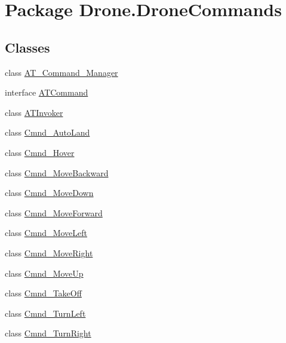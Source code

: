 \hypertarget{namespace_drone_1_1_drone_commands}{}\section{Package Drone.\+Drone\+Commands}
\label{namespace_drone_1_1_drone_commands}
\subsection*{Classes}
\begin{DoxyCompactItemize}
\item 
class \hyperlink{class_drone_1_1_drone_commands_1_1_a_t___command___manager}{A\+T\+\_\+\+Command\+\_\+\+Manager}
\item 
interface \hyperlink{interface_drone_1_1_drone_commands_1_1_a_t_command}{A\+T\+Command}
\item 
class \hyperlink{class_drone_1_1_drone_commands_1_1_a_t_invoker}{A\+T\+Invoker}
\item 
class \hyperlink{class_drone_1_1_drone_commands_1_1_cmnd___auto_land}{Cmnd\+\_\+\+Auto\+Land}
\item 
class \hyperlink{class_drone_1_1_drone_commands_1_1_cmnd___hover}{Cmnd\+\_\+\+Hover}
\item 
class \hyperlink{class_drone_1_1_drone_commands_1_1_cmnd___move_backward}{Cmnd\+\_\+\+Move\+Backward}
\item 
class \hyperlink{class_drone_1_1_drone_commands_1_1_cmnd___move_down}{Cmnd\+\_\+\+Move\+Down}
\item 
class \hyperlink{class_drone_1_1_drone_commands_1_1_cmnd___move_forward}{Cmnd\+\_\+\+Move\+Forward}
\item 
class \hyperlink{class_drone_1_1_drone_commands_1_1_cmnd___move_left}{Cmnd\+\_\+\+Move\+Left}
\item 
class \hyperlink{class_drone_1_1_drone_commands_1_1_cmnd___move_right}{Cmnd\+\_\+\+Move\+Right}
\item 
class \hyperlink{class_drone_1_1_drone_commands_1_1_cmnd___move_up}{Cmnd\+\_\+\+Move\+Up}
\item 
class \hyperlink{class_drone_1_1_drone_commands_1_1_cmnd___take_off}{Cmnd\+\_\+\+Take\+Off}
\item 
class \hyperlink{class_drone_1_1_drone_commands_1_1_cmnd___turn_left}{Cmnd\+\_\+\+Turn\+Left}
\item 
class \hyperlink{class_drone_1_1_drone_commands_1_1_cmnd___turn_right}{Cmnd\+\_\+\+Turn\+Right}
\end{DoxyCompactItemize}
